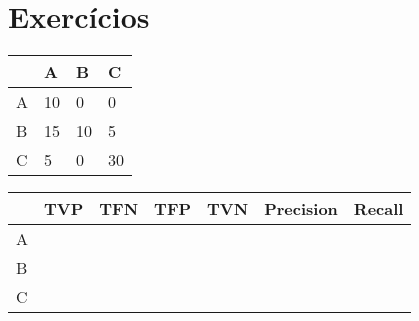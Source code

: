 \documentclass[oneside]{article}            %
\begin{document}
    \section{Exercícios}
    \begin{table}[h]
        \begin{tabular}{l|l|l|l|}
        \cline{2-4}
                                & A  & B  & C  \\ \hline
        \multicolumn{1}{|l|}{A} & 10 & 0  & 0  \\ \hline
        \multicolumn{1}{|l|}{B} & 15 & 10 & 5  \\ \hline
        \multicolumn{1}{|l|}{C} & 5  & 0  & 30 \\ \hline
        \end{tabular}
        \end{table}

        \begin{table}[h]
            \begin{tabular}{l|l|l|l|l|l|l|}
            \cline{2-7}
                                    & TVP & TFN & TFP & TVN & Precision & Recall \\ \hline
            \multicolumn{1}{|l|}{A} &     &     &     &     &           &        \\ \hline
            \multicolumn{1}{|l|}{B} &     &     &     &     &           &        \\ \hline
            \multicolumn{1}{|l|}{C} &     &     &     &     &           &        \\ \hline
            \end{tabular}
            \end{table}
\end{document}
